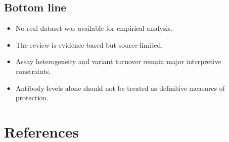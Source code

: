 \documentclass[12pt]{article}
\begin{document}
\subsection*{Bottom line}
\begin{itemize}[leftmargin=1.5em]
    \item No real dataset was available for empirical analysis.
    \item The review is evidence-based but source-limited.
    \item Assay heterogeneity and variant turnover remain major interpretive constraints.
    \item Antibody levels alone should not be treated as definitive measures of protection.
\end{itemize}

\section{References}
\end{document}
